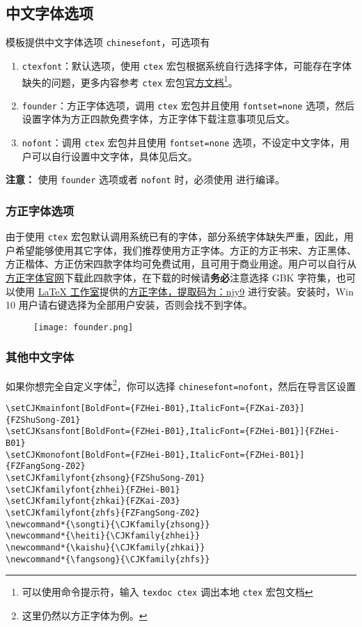 \documentclass[cn,geye,blue,14pt,normal]{elegantnote}
\begin{document}
\subsection{中文字体选项}
模板提供中文字体选项 \lstinline{chinesefont}，可选项有
\begin{enumerate}
  \item \lstinline{ctexfont}：默认选项，使用 \lstinline{ctex} 宏包根据系统自行选择字体，可能存在字体缺失的问题，更多内容参考 \lstinline{ctex} 宏包\href{https://ctan.org/pkg/ctex}{官方文档}\footnote{可以使用命令提示符，输入 \lstinline{texdoc ctex} 调出本地 \lstinline{ctex} 宏包文档}。
  \item \lstinline{founder}：方正字体选项，调用 \lstinline{ctex} 宏包并且使用 \lstinline{fontset=none} 选项，然后设置字体为方正四款免费字体，方正字体下载注意事项见后文。
  \item \lstinline{nofont}：调用 \lstinline{ctex} 宏包并且使用 \lstinline{fontset=none} 选项，不设定中文字体，用户可以自行设置中文字体，具体见后文。
\end{enumerate}

\noindent \textbf{注意：} 使用 \lstinline{founder} 选项或者 \lstinline{nofont} 时，必须使用  进行编译。

\subsubsection{方正字体选项}
由于使用 \lstinline{ctex} 宏包默认调用系统已有的字体，部分系统字体缺失严重，因此，用户希望能够使用其它字体，我们推荐使用方正字体。方正的{\songti 方正书宋}、{\heiti 方正黑体}、{\kaishu 方正楷体}、{\fangsong 方正仿宋}四款字体均可免费试用，且可用于商业用途。用户可以自行从\href{http://www.foundertype.com/}{方正字体官网}下载此四款字体，在下载的时候请\textbf{务必}注意选择 GBK 字符集，也可以使用 \href{https://www.latexstudio.net/}{\LaTeX{} 工作室}提供的\href{https://pan.baidu.com/s/1BgbQM7LoinY7m8yeP25Y7Q}{方正字体，提取码为：njy9} 进行安装。安装时，{\kaishu Win 10 用户请右键选择为全部用户安装，否则会找不到字体。}

\begin{figure}[!htb]
  \centering
  \texttt{[image: founder.png]}
\end{figure}

\subsubsection{其他中文字体}
如果你想完全自定义字体\footnote{这里仍然以方正字体为例。}，你可以选择 \lstinline{chinesefont=nofont}，然后在导言区设置
\begin{lstlisting}
\setCJKmainfont[BoldFont={FZHei-B01},ItalicFont={FZKai-Z03}]{FZShuSong-Z01}
\setCJKsansfont[BoldFont={FZHei-B01},ItalicFont={FZHei-B01}]{FZHei-B01}
\setCJKmonofont[BoldFont={FZHei-B01},ItalicFont={FZHei-B01}]{FZFangSong-Z02}
\setCJKfamilyfont{zhsong}{FZShuSong-Z01}
\setCJKfamilyfont{zhhei}{FZHei-B01}
\setCJKfamilyfont{zhkai}{FZKai-Z03}
\setCJKfamilyfont{zhfs}{FZFangSong-Z02}
\newcommand*{\songti}{\CJKfamily{zhsong}}
\newcommand*{\heiti}{\CJKfamily{zhhei}}
\newcommand*{\kaishu}{\CJKfamily{zhkai}}
\newcommand*{\fangsong}{\CJKfamily{zhfs}}
\end{lstlisting}
\end{document}
